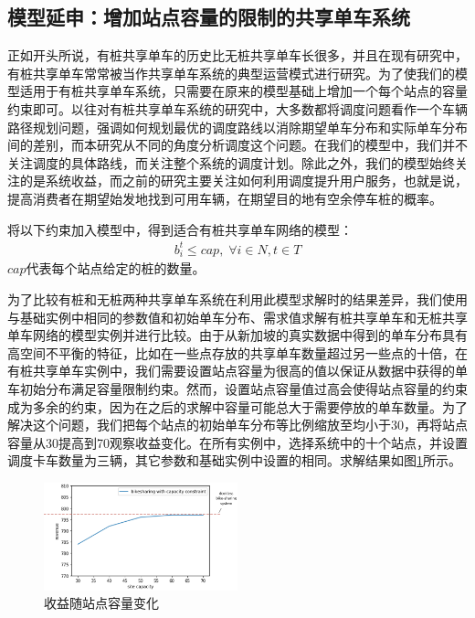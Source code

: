 \documentclass[]{tongjithesis}
\numberwithin{equation}{chapter}
\begin{document}
\subsection{模型延申：增加站点容量的限制的共享单车系统}
正如开头所说，有桩共享单车的历史比无桩共享单车长很多，并且在现有研究中，有桩共享单车常常被当作共享单车系统的典型运营模式进行研究。为了使我们的模型适用于有桩共享单车系统，只需要在原来的模型基础上增加一个每个站点的容量约束即可。以往对有桩共享单车系统的研究中，大多数都将调度问题看作一个车辆路径规划问题，强调如何规划最优的调度路线以消除期望单车分布和实际单车分布间的差别\cite{chemla2013bike,liu2016rebalancing,pfrommer2014dynamic}，而本研究从不同的角度分析调度这个问题。在我们的模型中，我们并不关注调度的具体路线，而关注整个系统的调度计划。除此之外，我们的模型始终关注的是系统收益，而之前的研究主要关注如何利用调度提升用户服务，也就是说，提高消费者在期望始发地找到可用车辆，在期望目的地有空余停车桩的概率。

将以下约束加入模型中，得到适合有桩共享单车网络的模型：
\begin{align}
    {b_{i}^{t}}{\leq cap, \;  \forall i\in N, t \in T}
\end{align}
\noindent
$cap$代表每个站点给定的桩的数量。

为了比较有桩和无桩两种共享单车系统在利用此模型求解时的结果差异，我们使用与基础实例中相同的参数值和初始单车分布、需求值求解有桩共享单车和无桩共享单车网络的模型实例并进行比较。由于从新加坡的真实数据中得到的单车分布具有高空间不平衡的特征，比如在一些点存放的共享单车数量超过另一些点的十倍，在有桩共享单车实例中，我们需要设置站点容量为很高的值以保证从数据中获得的单车初始分布满足容量限制约束。然而，设置站点容量值过高会使得站点容量的约束成为多余的约束，因为在之后的求解中容量可能总大于需要停放的单车数量。为了解决这个问题，我们把每个站点的初始单车分布等比例缩放至均小于30，再将站点容量从30提高到70观察收益变化。在所有实例中，选择系统中的十个站点，并设置调度卡车数量为三辆，其它参数和基础实例中设置的相同。求解结果如图\ref{revenue_cap}所示。
\begin{figure}[H]
    \centering
    \includegraphics[width=0.5\textwidth]{figures_main/revenue_change_with_capacity.png}
    \caption{收益随站点容量变化}
    \label{revenue_cap}
\end{figure}
\end{document}
